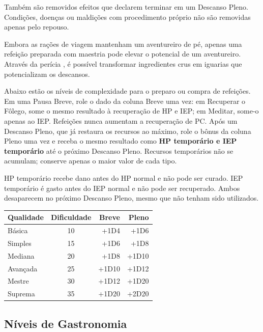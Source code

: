 Também são removidos efeitos que declarem terminar em um Descanso Pleno. Condições, doenças ou maldições com procedimento próprio não são removidas apenas pelo repouso.


Embora as rações de viagem mantenham um aventureiro de pé, apenas uma refeição preparada com maestria pode elevar o potencial de um aventureiro. Através da perícia , é possível transformar ingredientes crus em iguarias que potencializam os descansos.

Abaixo estão os níveis de complexidade para o preparo ou compra de refeições. Em uma Pausa Breve, role o dado da coluna Breve uma vez: em Recuperar o Fôlego, some o mesmo resultado à recuperação de HP e IEP; em Meditar, some-o apenas ao IEP. Refeições nunca aumentam a recuperação de PC. Após um Descanso Pleno, que já restaura os recursos ao máximo, role o bônus da coluna Pleno uma vez e receba o mesmo resultado como \textbf{HP temporário e IEP temporário} até o próximo Descanso Pleno. Recursos temporários não se acumulam; conserve apenas o maior valor de cada tipo.

HP temporário recebe dano antes do HP normal e não pode ser curado. IEP temporário é gasto antes do IEP normal e não pode ser recuperado. Ambos desaparecem no próximo Descanso Pleno, mesmo que não tenham sido utilizados.

\begin{center}
    \small 
    \renewcommand{\arraystretch}{1.4}
    \begin{tabularx}{\columnwidth}{@{} l c r r @{}}
        \toprule
        \rowcolor{gray!15} 
        \textbf{Qualidade} & \textbf{Dificuldade} & \textbf{Breve} & \textbf{Pleno} \\ 
        \midrule
        Básica      & 10 & +1D4  & +1D6  \\
        Simples     & 15 & +1D6  & +1D8  \\
        Mediana     & 20 & +1D8  & +1D10 \\
        Avançada    & 25 & +1D10 & +1D12 \\
        Mestre      & 30 & +1D12 & +1D20 \\
        \rowcolor{overgrownRed!10}
        Suprema     & 35 & +1D20 & +2D20 \\
        \bottomrule
    \end{tabularx}
\end{center}

\subsection*{Níveis de Gastronomia}

